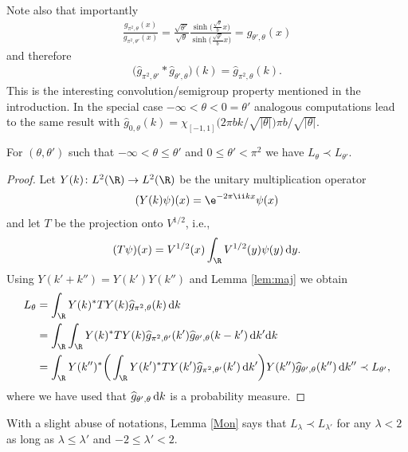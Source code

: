 Note also that importantly
\begin{gather*}
\frac{g_{\pi^2,\theta}(x)}{g_{\pi^2,\theta'}(x)}
=\frac{\sqrt{\theta'}}{\sqrt{\theta}}\frac{\sinh\big(\frac{\sqrt{\theta}}{b}x\big)} {\sinh\big(\frac{\sqrt{\theta'}}{b}x\big)}=g_{\theta',\theta}(x)
\end{gather*}
and therefore
\begin{gather*}
\big(\widehat{g}_{\pi^2,\theta'}*\widehat{g}_{\theta',\theta}\big)(k)=\widehat{g}_{\pi^2,\theta}(k).
\end{gather*}
This is the interesting convolution/semigroup property mentioned in the introduction. In the special case $-\infty<\theta <0=\theta'$ analogous computations lead to the same result with $\widehat{g}_{0,\theta}(k)=\chi_{[-1,1]}\big(2\pi bk/\sqrt{|\theta|}\big)\pi b/\sqrt{|\theta|}$.

\begin{Lemma}[monotonicity]\label{Mon}
For $(\theta, \theta')$ such that $-\infty<\theta \le \theta'$ and $0\le\theta' <\pi^2$ we have $L_\theta\prec L_{\theta'}$.
\end{Lemma}

\begin{proof}
Let $Y(k)\colon L^2(\R)\to L^2(\R)$ be the unitary multiplication operator
\begin{gather*}
(Y(k)\psi)(x)=\e^{-2\pi \ii k x}\psi(x)
\end{gather*}
and let $T$ be the projection onto $V^{1/2}$, i.e.,
\begin{gather*}
(T\psi)(x)=V^{1/2} (x) \int_\R V^{1/2}(y) \psi(y) \, {\rm d} y.
\end{gather*}
Using $Y(k'+k'')=Y(k')Y(k'')$ and Lemma \ref{lem:maj} we obtain
\begin{align*}
L_{\theta}&=\int_\R Y(k)^*T Y(k) \widehat{g}_{\pi^2,\theta}(k)\, {\rm d} k
\\
&=\int_\R\int_{\R} Y(k)^*T Y(k) \widehat{g}_{\pi^2,\theta'}(k') \widehat{g}_{\theta',\theta}(k-k')\, {\rm d} k' {\rm d} k
\\
&=\int_\R Y(k'')^*\bigg(\int_{\R} Y(k')^*T Y(k') \widehat{g}_{\pi^2,\theta'}(k')\, {\rm d} k'\bigg)Y(k'') \widehat{g}_{\theta',\theta}(k'')\, {\rm d} k'' \prec L_{\theta'},
\end{align*}
where we have used that $\widehat{g}_{\theta',\theta} \, {\rm d} k$ is a probability measure.
\end{proof}

\begin{Remark}
With a slight abuse of notations, Lemma \ref{Mon} says that $L_{\lambda}\prec L_{\lambda'}$ for any $\lambda<2$ as long as $\lambda\le \lambda'$ and $-2\le\lambda' <2$.
\end{Remark}

